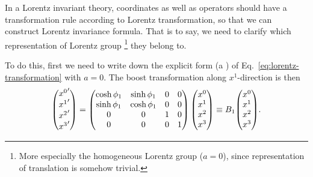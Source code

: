 In a Lorentz invariant theory, coordinates as well as operators should have a transformation rule according to Lorentz transformation, so that we can construct Lorentz invariance formula. That is to say, we need to clarify which representation of Lorentz group \footnote{More especially the homogeneous Lorentz group ($a=0$), since representation of translation is somehow trivial.} they belong to.

To do this, first we need to write down the explicit form (a ) of
Eq.~\eqref{eq:lorentz-transformation} with $a=0$. The boost transformation along $x^1$-direction is
then
\begin{equation} \label{eq:boost-explicit-form}
  \mqty({x^0}' \\ {x^1}' \\ {x^2}' \\{x^3}')
  = \mqty(\cosh \phi_1 & \sinh \phi_1 & 0 & 0 \\
          \sinh \phi_1 & \cosh \phi_1 & 0 & 0 \\
          0            & 0            & 1 & 0 \\
          0            & 0            & 0 & 1) \,
    \mqty(x^0 \\ x^1 \\ x^2 \\x^3)
  \defeq B_1 \mqty(x^0 \\ x^1 \\ x^2 \\x^3).
\end{equation}

